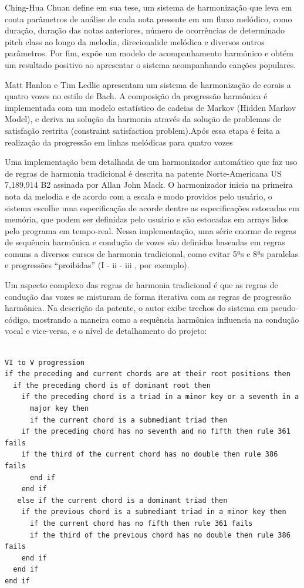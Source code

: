 \documentclass[draft]{ppgmus}
\begin{document}

Ching-Hua Chuan define em sua tese, um sistema de harmonização que leva em conta parâmetros
de análise de cada nota presente em um fluxo melódico, como duração, duração das notas anteriores, número
de ocorrências de determinado pitch class ao longo da melodia, direcionalide melódica e diversos outros
parâmetros. Por fim, expõe um modelo de acompanhamento harmônico e obtém um resultado positivo ao apresentar
o sistema acompanhando canções populares.

Matt Hanlon e Tim Ledlie apresentam um sistema de harmonização de corais a quatro vozes no estilo de Bach.
A composição da progressão harmônica é implementada com um modelo estatístico de cadeias de Markov
(Hidden Markov Model), e deriva na solução da harmonia através da solução de problemas
de satisfação restrita (constraint satisfaction problem).Após
essa etapa é feita a realização da progressão em linhas melódicas para quatro vozes

Uma implementação bem detalhada de um harmonizador automático que faz uso de
 regras de harmonia tradicional é descrita na patente Norte-Americana 
US 7,189,914 B2  assinada por Allan John Mack. O harmonizador inicia
na primeira nota da melodia e de acordo com a escala e modo providos
pelo usuário, o sistema escolhe uma especificação de acorde dentre
as especificações estocadas em memória, que podem ser definidas pelo usuário
e são estocadas em arrays lidos pelo programa em tempo-real.
Nessa implementação, uma série enorme de regras de sequência harmônica e 
condução de vozes são definidas baseadas em regras comuns a diversos cursos
de harmonia tradicional, como evitar 5ªs e 8ªs paralelas e progressões
``proibidas'' (I - ii - iii , por exemplo).

Um aspecto complexo das regras de harmonia tradicional é que as regras
de condução das vozes se misturam de forma iterativa com as regras de
progressão harmônica. Na descrição da patente, o autor exibe trechos do sistema em pseudo-código,
mostrando a maneira como a sequência harmônica influencia na condução vocal e vice-versa,
e o nível de detalhamento do projeto:

\begin{verbatim}

VI to V progression
if the preceding and current chords are at their root positions then
  if the preceding chord is of dominant root then
    if the preceding chord is a triad in a minor key or a seventh in a 
      major key then
      if the current chord is a submediant triad then
	if the preceding chord has no seventh and no fifth then rule 361 fails
	if the third of the current chord has no double then rule 386 fails
      end if
    end if
   else if the current chord is a dominant triad then
    if the previous chord is a submediant triad in a minor key then
      if the current chord has no fifth then rule 361 fails
      if the third of the previous chord has no double then rule 386 fails
    end if
  end if
end if
\end{verbatim}
\end{document}
